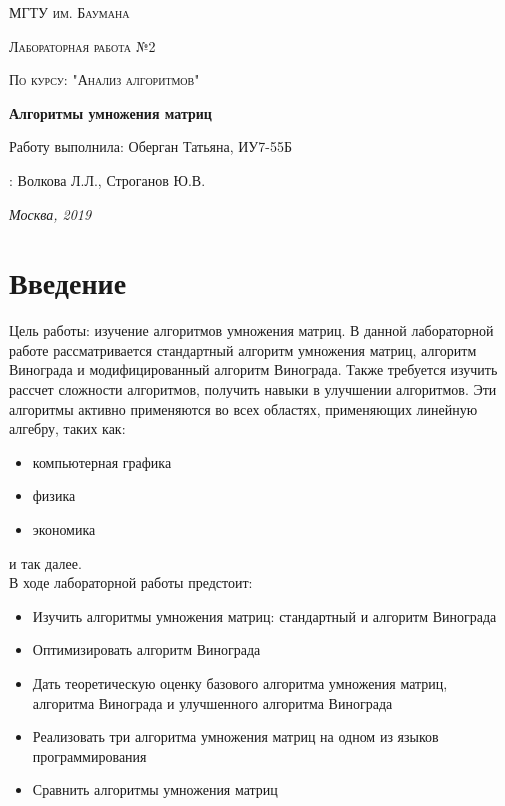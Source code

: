 \documentclass[12pt]{report}
\begin{document}
\begin{titlepage}
	\centering
	{\scshape\LARGE МГТУ им. Баумана \par}
	\vspace{3cm}
	{\scshape\Large Лабораторная работа №2\par}
	\vspace{0.5cm}	
	{\scshape\Large По курсу: "Анализ алгоритмов"\par}
	\vspace{1.5cm}
	{\huge\bfseries Алгоритмы умножения матриц\par}
	\vspace{2cm}
	\Large Работу выполнила: Оберган Татьяна, ИУ7-55Б\par
	\vspace{0.5cm}
	:  Волкова Л.Л., Строганов Ю.В.\par

	\vfill
	\large \textit {Москва, 2019} \par
\end{titlepage}

\tableofcontents

\newpage
\chapter*{Введение}
Цель работы: изучение алгоритмов умножения матриц. В данной лабораторной работе рассматривается стандартный алгоритм умножения матриц, алгоритм Винограда и модифицированный алгоритм Винограда.  Также требуется изучить рассчет сложности алгоритмов, получить навыки в улучшении алгоритмов.
Эти алгоритмы активно применяются во всех областях, применяющих линейную алгебру, таких как:
\begin{itemize}
	\item компьютерная графика
	\item физика
	\item экономика
\end{itemize}
и так далее.\\

В ходе лабораторной работы предстоит:
\begin{itemize}
	\item Изучить алгоритмы умножения матриц: стандартный и алгоритм Винограда 
	\item Оптимизировать алгоритм Винограда 
	\item Дать теоретическую оценку базового алгоритма умножения матриц, алгоритма Винограда и улучшенного алгоритма Винограда 
	\item Реализовать три алгоритма умножения матриц на одном из языков программирования  
	\item Сравнить алгоритмы умножения матриц  
\end{itemize}
\end{document}
